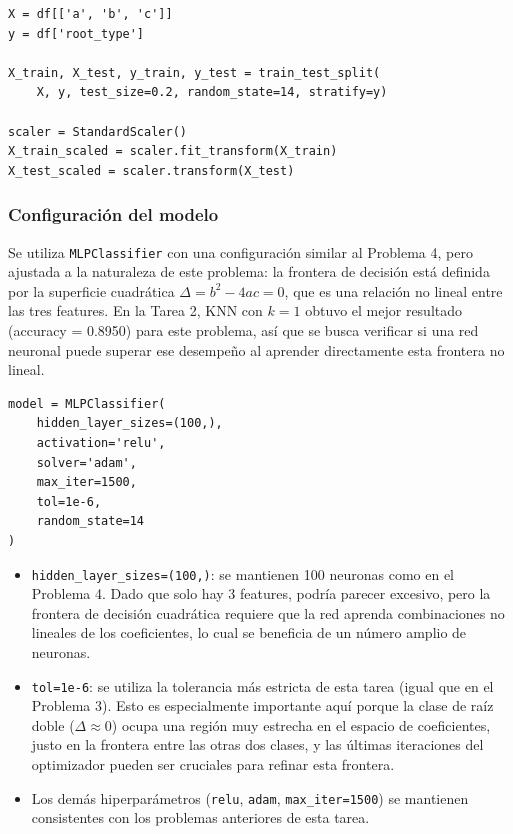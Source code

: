 \documentclass{article}
\begin{document}
\begin{lstlisting}
X = df[['a', 'b', 'c']]
y = df['root_type']

X_train, X_test, y_train, y_test = train_test_split(
    X, y, test_size=0.2, random_state=14, stratify=y)

scaler = StandardScaler()
X_train_scaled = scaler.fit_transform(X_train)
X_test_scaled = scaler.transform(X_test)
\end{lstlisting}

\subsubsection{Configuración del modelo}

Se utiliza \texttt{MLPClassifier} con una configuración similar al Problema 4, pero ajustada a la naturaleza de este problema: la frontera de decisión está definida por la superficie cuadrática $\Delta = b^2 - 4ac = 0$, que es una relación no lineal entre las tres features. En la Tarea 2, KNN con $k=1$ obtuvo el mejor resultado (accuracy = 0.8950) para este problema, así que se busca verificar si una red neuronal puede superar ese desempeño al aprender directamente esta frontera no lineal.

\begin{lstlisting}
model = MLPClassifier(
    hidden_layer_sizes=(100,),
    activation='relu',
    solver='adam',
    max_iter=1500,
    tol=1e-6,
    random_state=14
)
\end{lstlisting}

\begin{itemize}
    \item \texttt{hidden\_layer\_sizes=(100,)}: se mantienen 100 neuronas como en el Problema 4. Dado que solo hay 3 features, podría parecer excesivo, pero la frontera de decisión cuadrática requiere que la red aprenda combinaciones no lineales de los coeficientes, lo cual se beneficia de un número amplio de neuronas.
    \item \texttt{tol=1e-6}: se utiliza la tolerancia más estricta de esta tarea (igual que en el Problema 3). Esto es especialmente importante aquí porque la clase de raíz doble ($\Delta \approx 0$) ocupa una región muy estrecha en el espacio de coeficientes, justo en la frontera entre las otras dos clases, y las últimas iteraciones del optimizador pueden ser cruciales para refinar esta frontera.
    \item Los demás hiperparámetros (\texttt{relu}, \texttt{adam}, \texttt{max\_iter=1500}) se mantienen consistentes con los problemas anteriores de esta tarea.
\end{itemize}
\end{document}
